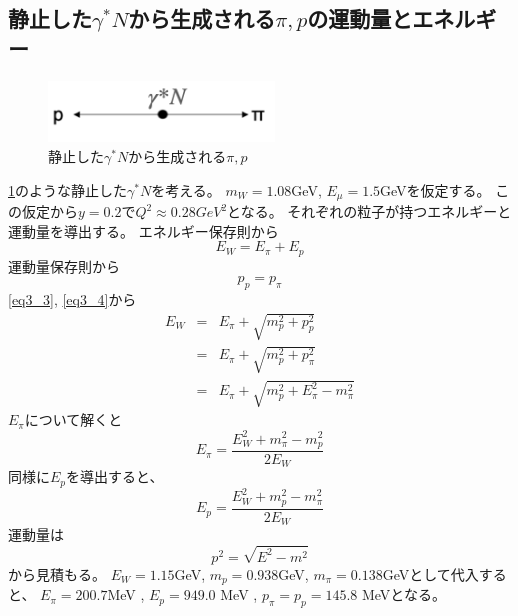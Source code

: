 \subsection{静止した$\gamma^* N$から生成される$\pi,p$の運動量とエネルギー}
\begin{figure}[H]
    \centering
    \includegraphics[width=6cm]{img/rest_middle_situation.png}
    \caption{静止した$\gamma^* N$から生成される$\pi,p$}
    \label{fig:angle5}
\end{figure}
\ref{fig:angle5}のような静止した$\gamma^* N$を考える。
$m_W = 1.08$GeV, $E_\mu = 1.5$GeVを仮定する。
この仮定から$y = 0.2$で$Q^2 \approx 0.28 GeV^2$となる。
それぞれの粒子が持つエネルギーと運動量を導出する。
エネルギー保存則から
\begin{equation}
    \label{eq3_3}
    E_W = E_\pi + E_p
\end{equation}
運動量保存則から
\begin{equation}
    \label{eq3_4}
    p_p = p_\pi
\end{equation}
\ref{eq3_3}, \ref{eq3_4}から
\begin{eqnarray}
    E_W  & =  & E_\pi + \sqrt{m_p^2 + p_p^2} \\
    & = & E_\pi + \sqrt{m_p^2 + p_\pi^2} \\
    & = & E_\pi + \sqrt{m_p^2 + E_\pi^2 - m_\pi^2}
\end{eqnarray}
$E_\pi$について解くと
\begin{equation}
    E_\pi = \dfrac{E_W ^2 + m_\pi ^2 - m_p ^2}{2E_W}
\end{equation}
同様に$E_p$を導出すると、
\begin{equation}
    E_p = \dfrac{E_W ^2 + m_p ^2 - m_\pi ^2}{2E_W}
\end{equation}
運動量は
\begin{equation}
    p^2 = \sqrt{E^2 - m^2}
\end{equation}
から見積もる。
$E_W = 1.15$GeV, $m_p = 0.938$GeV, $m_\pi = 0.138$GeVとして代入すると、
$E_π = 200.7$MeV , $E_p = 949.0$ MeV , $p_π = p_p = 145.8$ MeVとなる。

